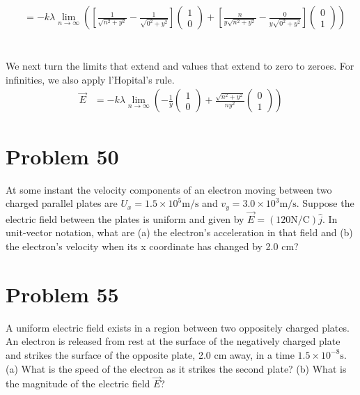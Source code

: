 \documentclass[12pt]{article}
\begin{document}
\begin{align*}
        &=  -k \lambda \lim_{n \rightarrow \infty}\left(\left[\frac{1}{\sqrt{n^2 + y^2}} - \frac{1}{\sqrt{0^2 + y^2}}\right] \begin{pmatrix}1\\0\end{pmatrix} + \left[\frac{n}{y\sqrt{n^2 + y^2}} - \frac{0}{y\sqrt{0^2 + y^2}}\right] \begin{pmatrix}0\\1\end{pmatrix}\right)
\end{align*}
\\ \\
We next turn the limits that extend and values that extend to zero to zeroes. For infinities, we also apply l'Hopital's rule. 
\begin{align*}
    \vec{E} &=
        -k \lambda \lim_{n \rightarrow \infty}\left(-\frac{1}{y}\begin{pmatrix}1\\0\end{pmatrix} + \frac{\sqrt{n^2 + y^2}}{ny^2} \begin{pmatrix}0\\1\end{pmatrix}\right)
\end{align*}

\pagebreak
\section{Problem 50}
At some instant the velocity components of an electron moving between two charged parallel plates are $U_x = 1.5 \times 10^5 \unit{\meter/\second}$ and $v_y = 3.0 \times 10^3 \unit{\meter/\second}$. Suppose the electric field between the plates is uniform and given by $\vec{E} = (120 \unit{\newton/\coulomb})\hat{j}$. In unit-vector notation, what are (a) the electron's acceleration in that field and (b) the electron's velocity when its x coordinate has changed by 2.0 cm?

\section{Problem 55}
A uniform electric field exists in a region between two oppositely charged plates. An electron is released from rest at the surface of the negatively charged plate and strikes the surface of the opposite plate, 2.0 cm away, in a time $1.5 \times 10^{-8} \unit{\second}$. (a) What is the speed of the electron as it strikes the second plate? (b) What is the magnitude of the electric field $\vec{E}$?
\end{document}
